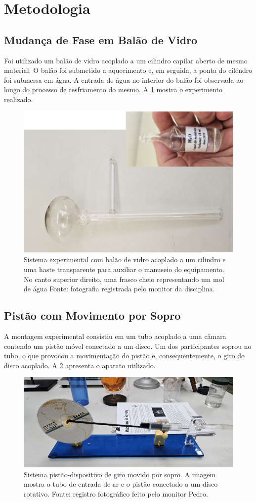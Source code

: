 \section{Metodologia}

\subsection{Mudança de Fase em Balão de Vidro}
Foi utilizado um balão de vidro acoplado a um cilindro capilar aberto de mesmo material. O balão foi submetido a aquecimento e, em seguida, a ponta do ciléndro foi submersa em água. A entrada de água no interior do balão foi observada ao longo do processo de resfriamento do mesmo. A \cref{fig:balão} mostra o experimento realizado.

\begin{figure}[H]
\centering
\includegraphics[width=0.30\linewidth]{fig/balao.png}
\caption{Sistema experimental com balão de vidro acoplado a um cilindro e uma haste transparente para auxiliar o manuseio do equipamento. No canto superior direito, uma frasco cheio representando um mol de água Fonte: fotografia registrada pelo monitor da disciplina.}
\label{fig:balão}
\end{figure}

\subsection{Pistão com Movimento por Sopro}
A montagem experimental consistiu em um tubo acoplado a uma câmara contendo um pistão móvel conectado a um disco. Um dos participantes soprou no tubo, o que provocou a movimentação do pistão e, consequentemente, o giro do disco acoplado. A \cref{fig:pistao} apresenta o aparato utilizado.

\begin{figure}[H]
\centering
\includegraphics[width=0.45\linewidth]{fig/pistao.png}
\caption{Sistema pistão-dispositivo de giro movido por sopro. A imagem mostra o tubo de entrada de ar e o pistão conectado a um disco rotativo. Fonte: registro fotográfico feito pelo monitor Pedro.}
\label{fig:pistao}
\end{figure}

